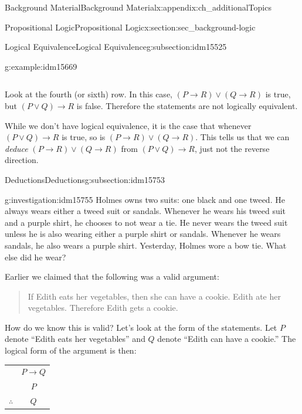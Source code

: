 \documentclass[oneside,10pt,]{book}
\numberwithin{equation}{chapter}
\newcommand{\hrulethin}  {\noalign{\hrule height 0.04em}}
\def\imp{\rightarrow}
\begin{document}
\begin{appendixptx}{Background Material}{}{Background Material}{}{}{x:appendix:ch_additionalTopics}
\begin{sectionptx}{Propositional Logic}{}{Propositional Logic}{}{}{x:section:sec_background-logic}
\begin{subsectionptx}{Logical Equivalence}{}{Logical Equivalence}{}{}{g:subsection:idm15525}
\begin{example}{}{g:example:idm15669}
\begin{sidebyside}{1}{0}{0}{0}
\begin{sbspanel}{1}
{\begin{tabular}{cAcAcBcAc}
\end{tabular}
\par}
\end{sbspanel}%
\end{sidebyside}%
\par
Look at the fourth (or sixth) row. In this case, \((P \imp R) \vee (Q \imp R)\) is true, but \((P \vee Q) \imp R\) is false. Therefore the statements are not logically equivalent.%
\par
While we don't have logical equivalence, it is the case that whenever \((P \vee Q) \imp R\) is true, so is \((P \imp R) \vee (Q \imp R)\).  This tells us that we can \emph{deduce} \((P \imp R) \vee (Q \imp R)\) from \((P \vee Q) \imp R\), just not the reverse direction.%
\end{example}
\end{subsectionptx}
%
%
\typeout{************************************************}
\typeout{************************************************}
%
\begin{subsectionptx}{Deductions}{}{Deductions}{}{}{g:subsection:idm15753}
\begin{investigation}{}{g:investigation:idm15755}%
Holmes owns two suits: one black and one tweed. He always wears either a tweed suit or sandals. Whenever he wears his tweed suit and a purple shirt, he chooses to not wear a tie. He never wears the tweed suit unless he is also wearing either a purple shirt or sandals. Whenever he wears sandals, he also wears a purple shirt. Yesterday, Holmes wore a bow tie. What else did he wear?%
\end{investigation}
Earlier we claimed that the following was a valid argument:%
\begin{quote}%
If Edith eats her vegetables, then she can have a cookie. Edith ate her vegetables. Therefore Edith gets a cookie.%
\end{quote}
How do we know this is valid? Let's look at the form of the statements. Let \(P\) denote ``Edith eats her vegetables'' and \(Q\) denote ``Edith can have a cookie.'' The logical form of the argument is then:%
\begin{sidebyside}{1}{0}{0}{0}%
\begin{sbspanel}{1}%
{\centering%
\begin{tabular}{cc}
&\(P \imp Q\)\tabularnewline[0pt]
&\(P\)\tabularnewline\hrulethin
\(\therefore\)&\(Q\)
\end{tabular}
\par}
\end{sbspanel}%

\end{sidebyside}
\end{subsectionptx}
\end{sectionptx}
\end{appendixptx}
\end{document}
